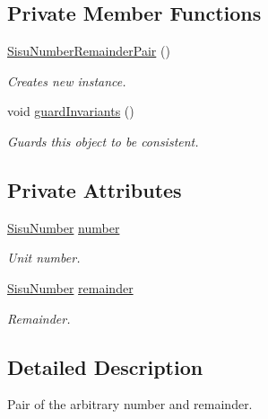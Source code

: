 \subsection*{Private Member Functions}
\begin{DoxyCompactItemize}
\item 
\hyperlink{classcom_1_1aarrelaakso_1_1drawl_1_1_sisu_number_remainder_pair_adc48547d9eb6d9b59734cda97198e37c}{Sisu\+Number\+Remainder\+Pair} ()
\begin{DoxyCompactList}\small\item\em Creates new instance. \end{DoxyCompactList}\item 
void \hyperlink{classcom_1_1aarrelaakso_1_1drawl_1_1_sisu_number_remainder_pair_ac1a84d348f25642a02cae7df8903119c}{guard\+Invariants} ()
\begin{DoxyCompactList}\small\item\em Guards this object to be consistent. \end{DoxyCompactList}\end{DoxyCompactItemize}
\subsection*{Private Attributes}
\begin{DoxyCompactItemize}
\item 
\hyperlink{classcom_1_1aarrelaakso_1_1drawl_1_1_sisu_number}{Sisu\+Number} \hyperlink{classcom_1_1aarrelaakso_1_1drawl_1_1_sisu_number_remainder_pair_a7ff7c95e41cb9dfbccb419fc75d05706}{number}
\begin{DoxyCompactList}\small\item\em Unit number. \end{DoxyCompactList}\item 
\hyperlink{classcom_1_1aarrelaakso_1_1drawl_1_1_sisu_number}{Sisu\+Number} \hyperlink{classcom_1_1aarrelaakso_1_1drawl_1_1_sisu_number_remainder_pair_a2db9bc3ff60d0078b3341f75dd830890}{remainder}
\begin{DoxyCompactList}\small\item\em Remainder. \end{DoxyCompactList}\end{DoxyCompactItemize}


\subsection{Detailed Description}
Pair of the arbitrary number and remainder. 

